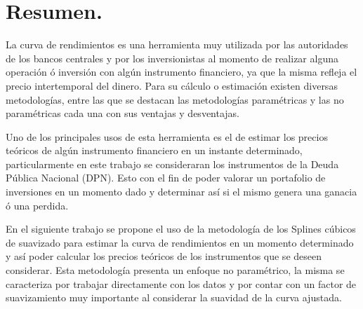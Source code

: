 \chapter*{Resumen.}

\hspace{0.4cm} La curva de rendimientos es una herramienta muy utilizada por las autoridades de los bancos centrales y por los inversionistas al momento de realizar alguna operaci\'on \'o inversi\'on con alg\'un instrumento financiero, ya que la misma refleja el precio intertemporal del dinero. Para su c\'alculo o estimaci\'on existen diversas metodolog\'ias, entre las que se destacan las metodolog\'ias param\'etricas y las no param\'etricas cada una con sus ventajas y desventajas.

\hspace{0.4cm} Uno de los principales usos de esta herramienta es el de estimar los precios te\'oricos de alg\'un instrumento financiero en un instante determinado, particularmente en este trabajo se consideraran los instrumentos de la Deuda P\'ublica Nacional (DPN). Esto con el fin de poder valorar un portafolio de inversiones en un momento dado y determinar as\'i si el mismo genera una ganacia \'o una perdida.

\hspace{0.4cm} En el siguiente trabajo se propone el uso de la metodolog\'ia de los Splines c\'ubicos de suavizado para estimar la curva de rendimientos en un momento determinado y as\'i poder calcular los precios te\'oricos de los instrumentos que se deseen considerar. Esta metodolog\'ia presenta un enfoque no param\'etrico, la misma se caracteriza por trabajar directamente con los datos y por contar con un factor de suavizamiento muy importante al considerar la suavidad de la curva ajustada. 



